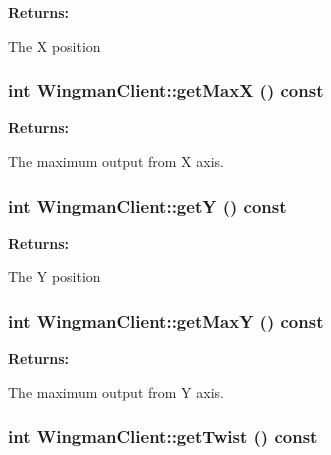 \begin{Desc}
\item[{\bf Returns: }]\par
 The X position \end{Desc}
\hypertarget{class_WingmanClient_a4}{
\subsubsection[getMaxX]{\setlength{\rightskip}{0pt plus 5cm}int Wingman\-Client::get\-Max\-X () const}}
\label{class_WingmanClient_a4}


\begin{Desc}
\item[{\bf Returns: }]\par
 The maximum output from X axis. \end{Desc}
\hypertarget{class_WingmanClient_a5}{
\subsubsection[getY]{\setlength{\rightskip}{0pt plus 5cm}int Wingman\-Client::get\-Y () const}}
\label{class_WingmanClient_a5}


\begin{Desc}
\item[{\bf Returns: }]\par
 The Y position \end{Desc}
\hypertarget{class_WingmanClient_a6}{
\subsubsection[getMaxY]{\setlength{\rightskip}{0pt plus 5cm}int Wingman\-Client::get\-Max\-Y () const}}
\label{class_WingmanClient_a6}


\begin{Desc}
\item[{\bf Returns: }]\par
 The maximum output from Y axis. \end{Desc}
\hypertarget{class_WingmanClient_a7}{
\subsubsection[getTwist]{\setlength{\rightskip}{0pt plus 5cm}int Wingman\-Client::get\-Twist () const}}
\label{class_WingmanClient_a7}


